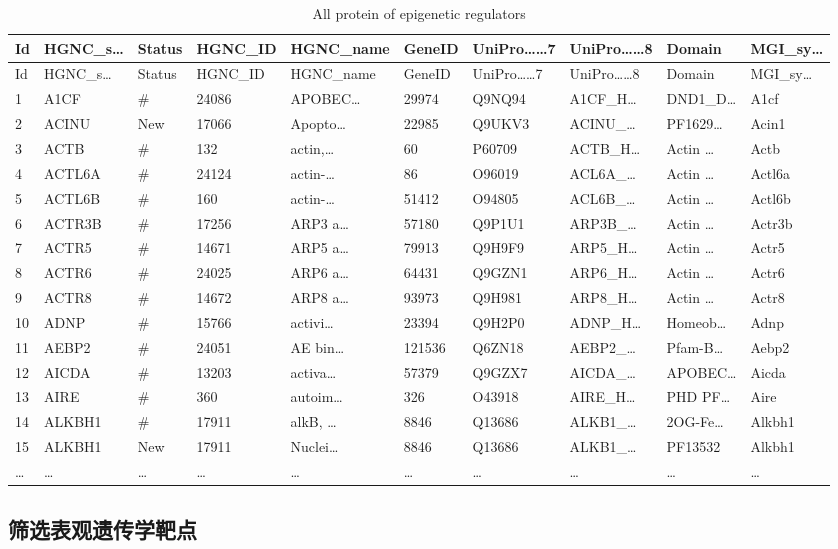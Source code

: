 \documentclass[
]{article}
\begin{document}
\begin{longtable}[]{@{}llllllllll@{}}
\caption{\label{tab:All-protein-of-epigenetic-regulators}All protein of epigenetic regulators}\tabularnewline
\toprule
Id & HGNC\_s\ldots{} & Status & HGNC\_ID & HGNC\_name & GeneID & UniPro\ldots\ldots7 & UniPro\ldots\ldots8 & Domain & MGI\_sy\ldots{}\tabularnewline
\midrule
\endfirsthead
\toprule
Id & HGNC\_s\ldots{} & Status & HGNC\_ID & HGNC\_name & GeneID & UniPro\ldots\ldots7 & UniPro\ldots\ldots8 & Domain & MGI\_sy\ldots{}\tabularnewline
\midrule
\endhead
1 & A1CF & \# & 24086 & APOBEC\ldots{} & 29974 & Q9NQ94 & A1CF\_H\ldots{} & DND1\_D\ldots{} & A1cf\tabularnewline
2 & ACINU & New & 17066 & Apopto\ldots{} & 22985 & Q9UKV3 & ACINU\_\ldots{} & PF1629\ldots{} & Acin1\tabularnewline
3 & ACTB & \# & 132 & actin,\ldots{} & 60 & P60709 & ACTB\_H\ldots{} & Actin \ldots{} & Actb\tabularnewline
4 & ACTL6A & \# & 24124 & actin-\ldots{} & 86 & O96019 & ACL6A\_\ldots{} & Actin \ldots{} & Actl6a\tabularnewline
5 & ACTL6B & \# & 160 & actin-\ldots{} & 51412 & O94805 & ACL6B\_\ldots{} & Actin \ldots{} & Actl6b\tabularnewline
6 & ACTR3B & \# & 17256 & ARP3 a\ldots{} & 57180 & Q9P1U1 & ARP3B\_\ldots{} & Actin \ldots{} & Actr3b\tabularnewline
7 & ACTR5 & \# & 14671 & ARP5 a\ldots{} & 79913 & Q9H9F9 & ARP5\_H\ldots{} & Actin \ldots{} & Actr5\tabularnewline
8 & ACTR6 & \# & 24025 & ARP6 a\ldots{} & 64431 & Q9GZN1 & ARP6\_H\ldots{} & Actin \ldots{} & Actr6\tabularnewline
9 & ACTR8 & \# & 14672 & ARP8 a\ldots{} & 93973 & Q9H981 & ARP8\_H\ldots{} & Actin \ldots{} & Actr8\tabularnewline
10 & ADNP & \# & 15766 & activi\ldots{} & 23394 & Q9H2P0 & ADNP\_H\ldots{} & Homeob\ldots{} & Adnp\tabularnewline
11 & AEBP2 & \# & 24051 & AE bin\ldots{} & 121536 & Q6ZN18 & AEBP2\_\ldots{} & Pfam-B\ldots{} & Aebp2\tabularnewline
12 & AICDA & \# & 13203 & activa\ldots{} & 57379 & Q9GZX7 & AICDA\_\ldots{} & APOBEC\ldots{} & Aicda\tabularnewline
13 & AIRE & \# & 360 & autoim\ldots{} & 326 & O43918 & AIRE\_H\ldots{} & PHD PF\ldots{} & Aire\tabularnewline
14 & ALKBH1 & \# & 17911 & alkB, \ldots{} & 8846 & Q13686 & ALKB1\_\ldots{} & 2OG-Fe\ldots{} & Alkbh1\tabularnewline
15 & ALKBH1 & New & 17911 & Nuclei\ldots{} & 8846 & Q13686 & ALKB1\_\ldots{} & PF13532 & Alkbh1\tabularnewline
\ldots{} & \ldots{} & \ldots{} & \ldots{} & \ldots{} & \ldots{} & \ldots{} & \ldots{} & \ldots{} & \ldots{}\tabularnewline
\bottomrule
\end{longtable}

\hypertarget{ux7b5bux9009ux8868ux89c2ux9057ux4f20ux5b66ux9776ux70b9}{%
\subsection{筛选表观遗传学靶点}\label{ux7b5bux9009ux8868ux89c2ux9057ux4f20ux5b66ux9776ux70b9}}
\end{document}
